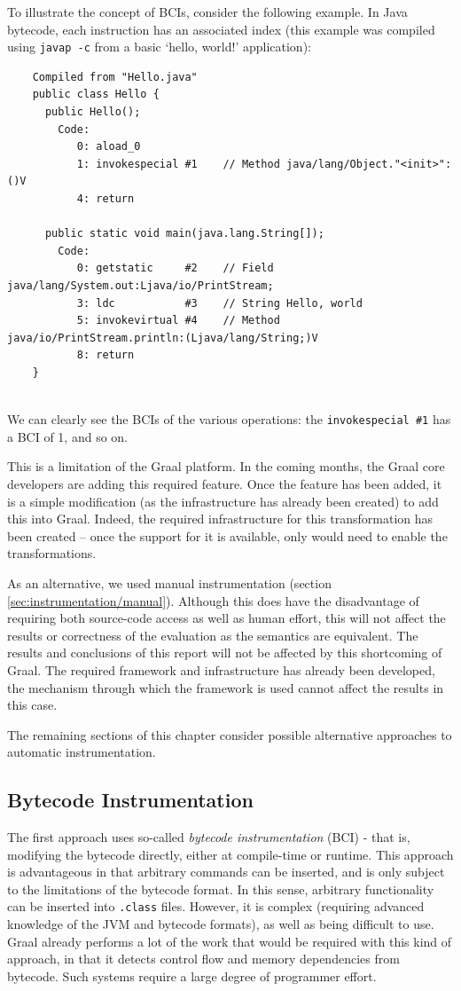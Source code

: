 	To illustrate the concept of BCIs, consider the following example. In Java bytecode, each instruction has an associated index (this example was compiled using \texttt{javap -c} from a basic `hello, world!' application):
	
	\begin{verbatim}
	Compiled from "Hello.java"
	public class Hello {
	  public Hello();
	    Code:
	       0: aload_0       
	       1: invokespecial #1    // Method java/lang/Object."<init>":()V
	       4: return        
	
	  public static void main(java.lang.String[]);
	    Code:
	       0: getstatic     #2    // Field java/lang/System.out:Ljava/io/PrintStream;
	       3: ldc           #3    // String Hello, world
	       5: invokevirtual #4    // Method java/io/PrintStream.println:(Ljava/lang/String;)V
	       8: return        
	}
	
	\end{verbatim}
	
	We can clearly see the BCIs of the various operations: the \texttt{invokespecial \#1} has a BCI of 1, and so on.

	This is a limitation of the Graal platform. In the coming months, the Graal core developers are adding this required feature. Once the feature has been added, it is a simple modification (as the infrastructure has already been created) to add this into Graal. Indeed, the required infrastructure for this transformation has been created -- once the support for it is available, only would need to enable the transformations.
	
	As an alternative, we used manual instrumentation (section \ref{sec:instrumentation/manual}). Although this does have the disadvantage of requiring both source-code access as well as human effort, this will not affect the results or correctness of the evaluation as the semantics are equivalent. The results and conclusions of this report will not be affected by this shortcoming of Graal. The required framework and infrastructure has already been developed, the mechanism through which the framework is used cannot affect the results in this case.
	
	The remaining sections of this chapter consider possible alternative approaches to automatic instrumentation. 

	\subsection{Bytecode Instrumentation} \label{sec:instrumentation/bytecode-instr}
	The first approach uses so-called \textit{bytecode instrumentation} (BCI) - that is, modifying the bytecode directly, either at compile-time or runtime. This approach is advantageous in that arbitrary commands can be inserted, and is only subject to the limitations of the bytecode format. In this sense, arbitrary functionality can be inserted into \texttt{.class} files. However, it is complex (requiring advanced knowledge of the JVM and bytecode formats), as well as being difficult to use. Graal already performs a lot of the work that would be required with this kind of approach, in that it detects control flow and memory dependencies from bytecode. Such systems require a large degree of programmer effort.

